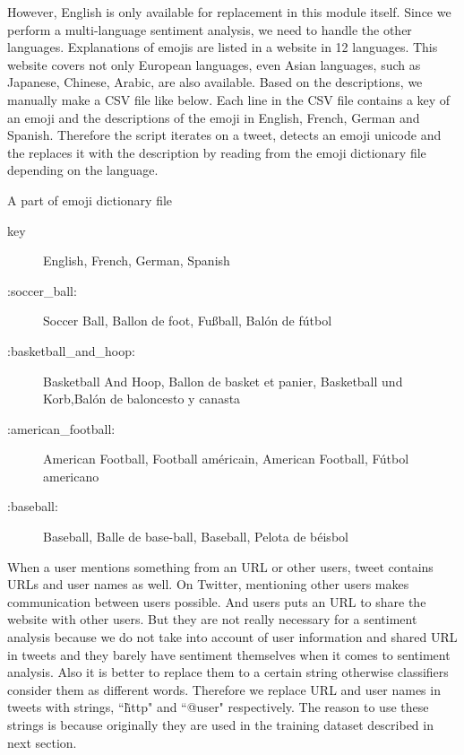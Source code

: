 However, English is only available for replacement in this module itself.
Since we perform a multi-language sentiment analysis, we need to handle the other languages.
Explanations of emojis are listed in a website \cite{emoji_explanation} in 12 languages. 
This website covers not only European languages, even Asian languages, such as Japanese, Chinese, Arabic, are also available.
Based on the descriptions, we manually make a CSV file like below.
Each line in the CSV file contains a key of an emoji and the descriptions of the emoji in English, French, German and Spanish.
Therefore the script iterates on a tweet, detects an emoji unicode and the replaces it with the description by reading from the emoji dictionary file depending on the language.
\begin{itembox}[c]{A part of emoji dictionary file}
	\begin{description}
		\item[key] English, French, German, Spanish
		\item[:soccer\_ball:] Soccer Ball, Ballon de foot, Fu{\ss}ball, Bal\'on de f\'utbol
		\item[:basketball\_and\_hoop:] Basketball And Hoop, Ballon de basket et panier, Basketball und Korb,Bal\'on de baloncesto y canasta
		\item[:american\_football:] American Football, Football am\'ericain, American Football, F\'utbol americano

		\item[:baseball:]Baseball, Balle de base-ball, Baseball, Pelota de b\'eisbol
	\end{description}
\end{itembox}

When a user mentions something from an URL or other users, tweet contains URLs and user names as well.
On Twitter, mentioning other users makes communication between users possible.
And users puts an URL to share the website with other users.
But they are not really necessary for a sentiment analysis because we do not take into account of user information and shared URL in tweets and they barely have sentiment themselves when it comes to sentiment analysis.  
Also it is better to replace them to a certain string otherwise classifiers consider them as different words.
Therefore we replace URL and user names in tweets with strings, ``\~http" and ``@user" respectively.
The reason to use these strings is because originally they are used in the training dataset described in next section.

